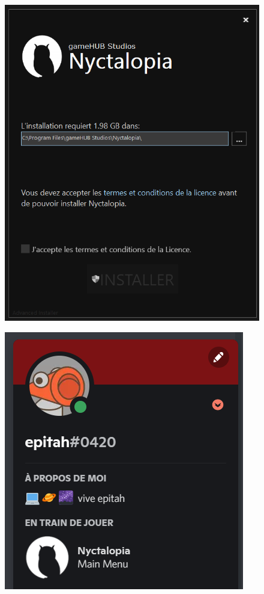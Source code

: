 \begin{figure}[H]
\centering
\begin{minipage}{.5\textwidth}
  \centering
  \includegraphics[width=.7\linewidth]{img/ui/installer.png}
  \label{fig:uiinstall}
\end{minipage}%
\begin{minipage}{.5\textwidth}
  \centering
  \includegraphics[width=.9\linewidth]{img/ui/DRPC.png}
  \label{fig:drpc}
\end{minipage}
\end{figure}

